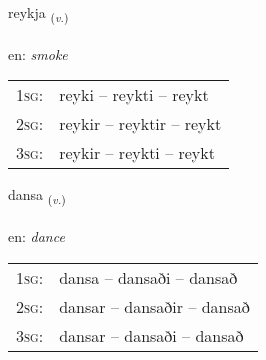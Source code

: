 \documentclass[frontgrid, backgrid]{flacards}\usepackage[]{graphicx}\usepackage[]{color}
\begin{document}
\renewcommand{\flhead}{\vskip5pt \fboxsep=0pt {\small\bfseries\footnotesize Sagnorð | Verb}}
\renewcommand{\fcfoot}{\vskip5pt \fboxsep=0pt \hspace{2pt}{\small\bfseries\footnotesize 2K}}

\renewcommand{\blhead}{\vskip5pt {\small\bfseries\footnotesize Sagnorð | Verb }}
\renewcommand{\bcfoot}{\vskip5pt \hspace{2pt}{\small\bfseries\footnotesize 2K}}


{reykja \small{\textsubscript{(\textit{v.})}} \\[1ex] %
\textphonetic{[reiːca]} \\
en: \emph{smoke} \\  [2ex]
\renewcommand*{\arraystretch}{0.8}
\begin{tabular}{p{1cm}l}
\textsc{1sg}: & reyki -- reykti -- reykt \\ 
\textsc{2sg}: & reykir -- reyktir -- reykt \\ 
\textsc{3sg}: & reykir -- reykti -- reykt \\ 
\end{tabular}
}

\renewcommand{\flhead}{\vskip5pt \fboxsep=0pt {\small\bfseries\footnotesize Sagnorð | Verb}}
\renewcommand{\fcfoot}{\vskip5pt \fboxsep=0pt \hspace{2pt}{\small\bfseries\footnotesize 2K}}

\renewcommand{\blhead}{\vskip5pt {\small\bfseries\footnotesize Sagnorð | Verb }}
\renewcommand{\bcfoot}{\vskip5pt \hspace{2pt}{\small\bfseries\footnotesize 2K}}


{dansa \small{\textsubscript{(\textit{v.})}} \\[1ex] %
\textphonetic{[tansa]} \\
en: \emph{dance} \\  [2ex]
\renewcommand*{\arraystretch}{0.8}
\begin{tabular}{p{1cm}l}
\textsc{1sg}: & dansa -- dansaði -- dansað \\ 
\textsc{2sg}: & dansar -- dansaðir -- dansað \\ 
\textsc{3sg}: & dansar -- dansaði -- dansað \\ 
\end{tabular}
}
\end{document}
